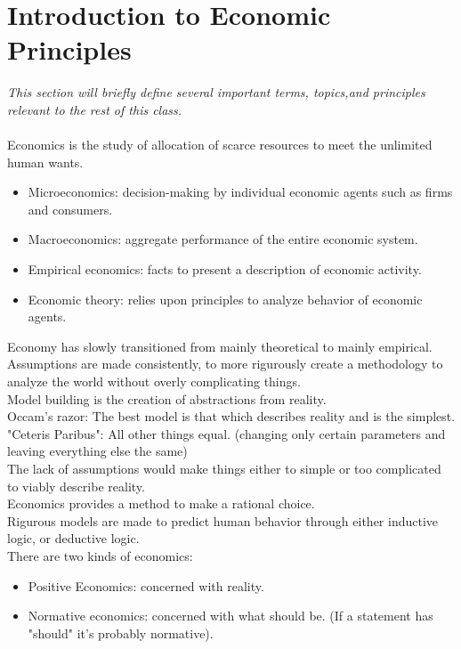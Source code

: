 \documentclass[nobib]{tufte-handout}
\begin{document}
\section{Introduction to Economic Principles}
\textit{This section will briefly define several important terms, topics,and principles relevant to the rest of this class.}\\~\\
Economics is the study of allocation of scarce resources to meet the unlimited
human wants.
\begin{itemize}
    \item Microeconomics: decision-making by individual economic agents such as firms and
          consumers.
    \item Macroeconomics: aggregate performance of the entire economic system.
    \item Empirical economics: facts to present a description of economic activity.
    \item Economic theory: relies upon principles to analyze behavior of economic agents.
\end{itemize}
Economy has slowly transitioned from mainly theoretical to mainly empirical.\\
Assumptions are made consistently, to more rigurously create a methodology to analyze the world without overly complicating things.\\
Model building is the creation of abstractions from reality.\\
\quad Occam's razor: The best model is that which describes reality and is the simplest.\\
\quad "Ceteris Paribus": All other things equal. (changing only certain parameters and leaving everything else the same)\\
\quad The lack of assumptions would make things either to simple or too complicated to viably describe reality.\\
\quad Economics provides a method to make a rational choice.\\
\quad Rigurous models are made to predict human behavior through either inductive logic, or deductive logic.\\
There are two kinds of economics:
\begin{itemize}
    \item Positive Economics: concerned with reality.
    \item Normative economics: concerned with what should be. (If a statement has
          "should" it's probably normative).
\end{itemize}
\end{document}
